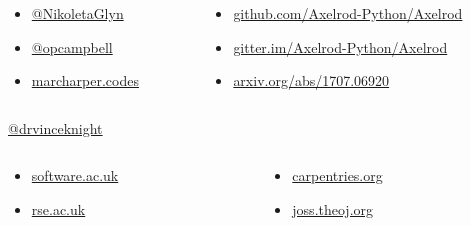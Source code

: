 \documentclass{beamer}
\begin{document}
\begin{frame}
   \begin{columns}
        \begin{column}{.35\textwidth}
            \begin{itemize}
                \item \href{https://twitter.com/NikoletaGlyn}{@NikoletaGlyn}
                \item \href{https://twitter.com/opcampbell}{@opcampbell}
                \item \href{http://marcharper.codes/}{marcharper.codes}
            \end{itemize}
        \end{column}
        \begin{column}{.65\textwidth}
            \begin{itemize}
                \item \href{https://github.com/Axelrod-Python/Axelrod}{github.com/Axelrod-Python/Axelrod}
                \item \href{https://gitter.im/Axelrod-Python/Axelrod}{gitter.im/Axelrod-Python/Axelrod}
                \item
                    \href{https://arxiv.org/abs/1707.06920}{arxiv.org/abs/1707.06920}
            \end{itemize}
        \end{column}
   \end{columns}

        \begin{center}
               \href{https://twitter.com/drvinceknight}{@drvinceknight}
        \end{center}

   \begin{columns}
        \begin{column}{.5\textwidth}
            \begin{itemize}
                \item
                    \href{https://www.software.ac.uk/}{software.ac.uk}
                \item
                    \href{http://rse.ac.uk/}{rse.ac.uk}
            \end{itemize}
        \end{column}
        \begin{column}{.5\textwidth}
            \begin{itemize}
            \item
                \href{https://carpentries.org/}{carpentries.org}
            \item
                \href{http://joss.theoj.org/}{joss.theoj.org}
            \end{itemize}
        \end{column}
    \end{columns}
\end{frame}
\end{document}
